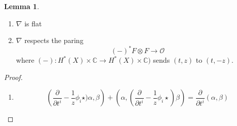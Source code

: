 \documentclass{amsart}
\theoremstyle{definition}
\newtheorem{lemma}[dummy]{Lemma}
\newcommand{\OO}{\mathcal{O}}
\newcommand{\C}{\mathbb{C}}
\begin{document}
\begin{lemma}

\begin{enumerate}
\item $\nabla$ is flat
\item $\nabla$ respects the paring
$$(-)^* F\otimes F\to \OO$$
where $(-):H^*(X)\times\C\to H^*(X)\times\C)$ sends $(t,z)$ to $(t,-z)$.

\end{enumerate}
\end{lemma}
\begin{proof}
\begin{enumerate}
We have the equation:

$$\left[\nabla_{\frac{\partial}{\partial t^i}},\nabla_{\frac{\partial}{\partial t^i}}\right]=\frac{1}{z}\left(\frac{\partial(\phi_j\star_t)}{\partial t^i}-\frac{\partial(\phi_i\star_t)}{\partial t^j}\right)+\frac{1}{z^2}[\phi_i\star_t,\phi_j\star_t]$$

Second part vanishes by WDVV equation, the first part vanishes by expanding the definition.


The meaning of the $z$ directions comes from the homogeneity; using the dimension of the moduli spaces we see that $\star_t$ is homogenous with respsect to

$$\left\{\begin{array}{rll}
\deg(e^{\sigma\cdot d}=q)&=c_1(x)\cdot d & \sigma\in H^2(X) \\
\deg(t^i)&=\left(1-\frac{1}{2}\deg(\phi_i)\right) & i\geq r+1 \\
\deg(e^{t^i}) & = c_1(X)\cdot\beta_i &
\end{array}
\right.$$

The factors of 1/2 come from switching between complex and real degree.

We want everything to be homogeneous; in particular, for

$$\frac{\partial}{\partial t^i} +\frac{1}{Z}\left(\phi_i\star \right)$$ to be homogeneous, we need $\deg z=1$.

Then
$$\nabla_{\frac{\partial}{\partial z}+E}=z\frac{\partial}{\partial z}+d_E+\mu$$
is a total grading operator -- the first two terms are the degree of variables, the $\mu$ term is the degree of cohomology classes.


\item

  $$\left(\frac{\partial}{\partial t^i}-\frac{1}{z}\phi_i\star)\alpha,\beta\right)+\left(\alpha,(\frac{\partial}{\partial t^i}-\frac{1}{z}\phi_i\star)\beta\right)=\frac{\partial}{\partial t^i}(\alpha,\beta)$$

\end{enumerate}
\end{proof}
\end{document}
